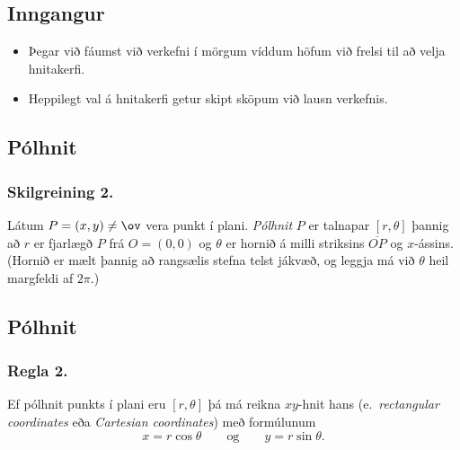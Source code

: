 \date{7.~janúar 2015}



\subsection{}
	\maketitle




\subsection{Inngangur}
 \begin {itemize}
  \item Þegar við fáumst við verkefni í mörgum víddum höfum við frelsi til að velja hnitakerfi.
  \item Heppilegt val á hnitakerfi getur skipt sköpum við lausn verkefnis.
 \end {itemize}




\subsection{Pólhnit} 

\subsubsection{Skilgreining 2.}
Látum $P=(x,y)\neq \ov$ vera punkt í plani.  {\em Pólhnit} $P$ er talnapar $[r,\theta]$ þannig að $r$ er fjarlægð $P$ frá 
$O=(0,0)$ og $\theta$ er hornið á milli striksins $\overline{OP}$ og $x$-ássins.  (Hornið er mælt þannig að rangsælis stefna telst jákvæð,  og leggja má við $\theta$ heil margfeldi af $2\pi$.)




\subsection{Pólhnit}
\subsubsection{Regla 2.}
  Ef pólhnit punkts í plani eru $[r, \theta]$ þá má reikna $xy$-hnit hans (e.~{\em rectangular coordinates} eða {\em Cartesian coordinates}) með formúlunum
$$x=r\cos\theta \qquad\mbox{og}\qquad y=r\sin\theta.$$

